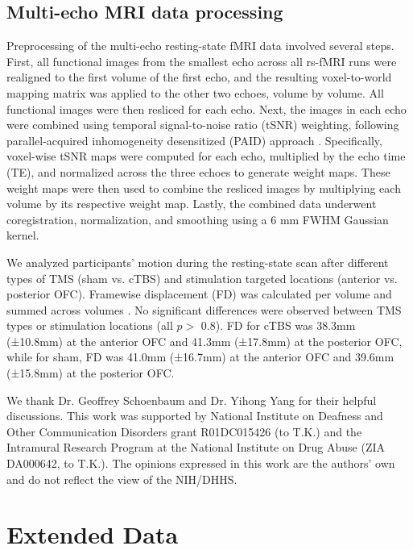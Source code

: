 \documentclass[lineno,sn-basic]{sn-jnl}%
\begin{document}
\subsection{Multi-echo MRI data processing}
\label{multi-echo}

Preprocessing of the multi-echo resting-state fMRI data involved several
steps. First, all functional images from the smallest echo across all
rs-fMRI runs were realigned to the first volume of the first echo, and
the resulting voxel-to-world mapping matrix was applied to the other two
echoes, volume by volume. All functional images were then resliced for
each echo. Next, the images in each echo were combined using temporal
signal-to-noise ratio (tSNR) weighting, following parallel-acquired
inhomogeneity desensitized (PAID) approach \citep{RN524}. Specifically, voxel-wise tSNR maps were computed for each echo, multiplied by the echo time (TE), and normalized across the three echoes to generate weight maps. These weight maps were then used to combine the resliced images by multiplying each volume by its respective weight map. Lastly, the combined data underwent coregistration, normalization, and
smoothing using a 6 mm FWHM Gaussian kernel.

We analyzed participants' motion during the resting-state scan after different types of TMS (sham vs. cTBS) and stimulation targeted locations (anterior vs. posterior OFC). Framewise displacement (FD) was calculated per volume and summed across volumes \citep{RN521}. No significant differences were observed between TMS types or stimulation locations (all $p>$ 0.8). FD for cTBS was 38.3mm (±10.8mm) at the anterior OFC and 41.3mm (±17.8mm) at the posterior OFC, while for sham, FD was 41.0mm (±16.7mm) at the anterior OFC and 39.6mm (±15.8mm) at the posterior OFC.



\backmatter



We thank Dr. Geoffrey Schoenbaum and Dr. Yihong Yang for their helpful discussions. This work was supported by National Institute on Deafness and Other Communication Disorders grant R01DC015426 (to T.K.) and the Intramural Research Program at the National Institute on Drug Abuse (ZIA DA000642, to T.K.). The opinions expressed in this work are the authors’ own and do not reflect the view of the NIH/DHHS.


\section{Extended Data}
\label{sec-EDFig}
\end{document}
